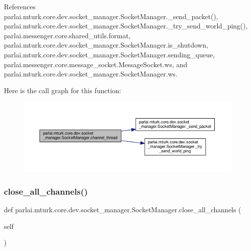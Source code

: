 References parlai.\+mturk.\+core.\+dev.\+socket\+\_\+manager.\+Socket\+Manager.\+\_\+send\+\_\+packet(), parlai.\+mturk.\+core.\+dev.\+socket\+\_\+manager.\+Socket\+Manager.\+\_\+try\+\_\+send\+\_\+world\+\_\+ping(), parlai.\+messenger.\+core.\+shared\+\_\+utils.\+format, parlai.\+mturk.\+core.\+dev.\+socket\+\_\+manager.\+Socket\+Manager.\+is\+\_\+shutdown, parlai.\+mturk.\+core.\+dev.\+socket\+\_\+manager.\+Socket\+Manager.\+sending\+\_\+queue, parlai.\+messenger.\+core.\+message\+\_\+socket.\+Message\+Socket.\+ws, and parlai.\+mturk.\+core.\+dev.\+socket\+\_\+manager.\+Socket\+Manager.\+ws.

Here is the call graph for this function\+:
\nopagebreak
\begin{figure}[H]
\begin{center}
\leavevmode
\includegraphics[width=350pt]{classparlai_1_1mturk_1_1core_1_1dev_1_1socket__manager_1_1SocketManager_a77dba972ee1a8e3dc165d2531864d974_cgraph}
\end{center}
\end{figure}
\mbox{\label{classparlai_1_1mturk_1_1core_1_1dev_1_1socket__manager_1_1SocketManager_ab8fb515ceb7db7a1c0395ca210593383}} 
\subsubsection{\texorpdfstring{close\+\_\+all\+\_\+channels()}{close\_all\_channels()}}
{\footnotesize\ttfamily def parlai.\+mturk.\+core.\+dev.\+socket\+\_\+manager.\+Socket\+Manager.\+close\+\_\+all\+\_\+channels (\begin{DoxyParamCaption}\item[{}]{self }\end{DoxyParamCaption})}

